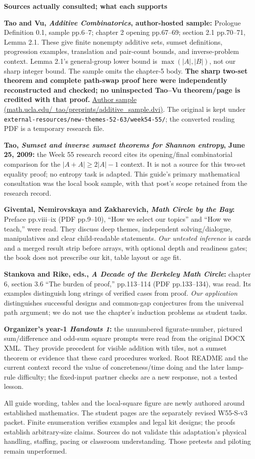 \documentclass[11pt]{article}
\newcommand{\sub}[1]{\textbf{#1}\par}
\begin{document}
\sub{Sources actually consulted; what each supports}
\textbf{Tao and Vu, \emph{Additive Combinatorics}, author-hosted sample:} Prologue Definition 0.1, sample pp.6--7; chapter 2 opening pp.67--69; section 2.1 pp.70--71, Lemma 2.1. These give finite nonempty additive sets, sumset definitions, progression examples, translation and pair-count bounds, and inverse-problem context. Lemma 2.1's general-group lower bound is $\max(|A|,|B|)$, not our sharp integer bound. The sample omits the chapter-5 body. \textbf{The sharp two-set theorem and complete path-swap proof here were independently reconstructed and checked; no uninspected Tao--Vu theorem/page is credited with that proof.}
\href{https://www.math.ucla.edu/~tao/preprints/additive_sample.dvi}{Author sample (math.ucla.edu/\string~tao/preprints/additive\_sample.dvi)}.
The original is kept under \texttt{external-resources/new-themes-52-63/week54-55/}; the converted reading PDF is a temporary research file.

\textbf{Tao, \emph{Sumset and inverse sumset theorems for Shannon entropy}, June 25, 2009:} the Week 55 research record cites its opening/final combinatorial comparison for the $|A+A|\geq2|A|-1$ context. It is not a source for this two-set equality proof; no entropy task is adapted. This guide's primary mathematical consultation was the local book sample, with that post's scope retained from the research record.

\textbf{Givental, Nemirovskaya and Zakharevich, \emph{Math Circle by the Bay}:} Preface pp.viii--ix (PDF pp.9--10), ``How we select our topics'' and ``How we teach,'' were read. They discuss deep themes, independent solving/dialogue, manipulatives and clear child-readable statements. \emph{Our untested inference} is cards and a merged result strip before arrays, with optional depth and readiness gates; the book does not prescribe our kit, table layout or age fit.

\textbf{Stankova and Rike, eds., \emph{A Decade of the Berkeley Math Circle}:} chapter 6, section 3.6 ``The burden of proof,'' pp.113--114 (PDF pp.133--134), was read. Its examples distinguish long strings of verified cases from proof. \emph{Our application} distinguishes successful designs and common-gap conjectures from the universal path argument; we do not use the chapter's induction problems as student tasks.

\textbf{Organizer's year-1 \emph{Handouts 1}:} the unnumbered figurate-number, pictured sum/difference and odd-sum square prompts were read from the original DOCX XML. They provide precedent for visible addition with tiles, not a sumset theorem or evidence that these card procedures worked. Root README and the current context record the value of concreteness/time doing and the later lamp-rule difficulty; the fixed-input partner checks are a new response, not a tested lesson.

All guide wording, tables and the local-square figure are newly authored around established mathematics. The student pages are the separately revised W55-S-v3 packet. Finite enumeration verifies examples and legal kit designs; the proofs establish arbitrary-size claims. Sources do not validate this adaptation's physical handling, staffing, pacing or classroom understanding. Those pretests and piloting remain unperformed.
\end{document}
